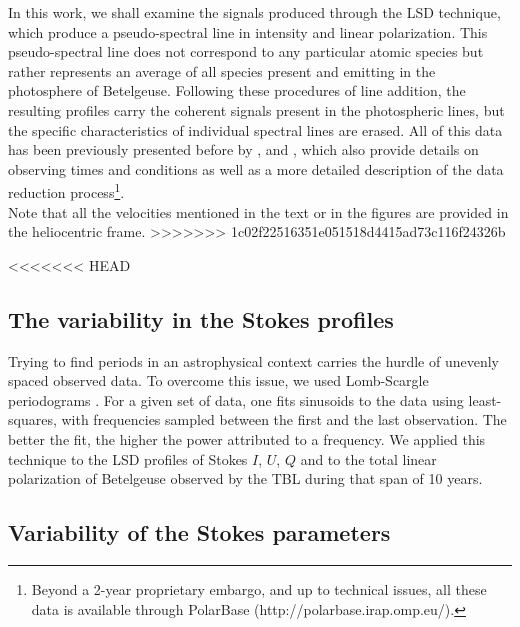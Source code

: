 \documentclass{aa}
\begin{document}
In this work, we shall examine the signals produced through the LSD technique, which produce a pseudo-spectral line in intensity 
and linear polarization. This pseudo-spectral line does not correspond to any particular atomic species but rather represents an average of all species present and emitting in the 
photosphere of Betelgeuse. Following these procedures of line addition, the resulting profiles carry the coherent signals present in the photospheric lines, but the specific characteristics of individual spectral lines are erased. All of this data has been previously presented before by \cite{auriere_discovery_2016}, \cite{mathias_evolution_2018} and 
\cite{lopez_ariste_three-dimensional_2022}, which also provide details on observing times and conditions as well as a more detailed description 
of the data reduction process\footnote[2]{Beyond a 2-year proprietary embargo, and up to technical issues, all these data is available through 
PolarBase (http://polarbase.irap.omp.eu/).}.\\
Note that all the velocities mentioned in the text or in the figures are provided in the heliocentric frame.
>>>>>>> 1c02f22516351e051518d4415ad73c116f24326b




<<<<<<< HEAD
\subsection{The variability in the Stokes profiles}


Trying to find periods in an astrophysical context carries the hurdle of unevenly spaced observed data. To overcome this issue, 
we used  Lomb-Scargle periodograms \citep{lomb_least-squares_1976,scargle_studies_1982}. For a given set of data, one fits sinusoids to the data
using least-squares, with frequencies sampled between the first and the last observation. The better the fit, the higher the power attributed to a frequency. 
We applied this technique to the  LSD profiles of Stokes $I$, $U$, $Q$ and to the total linear polarization of Betelgeuse observed by the TBL during 
that span of 10 years. 

\subsection{Variability of the Stokes parameters}
\end{document}
